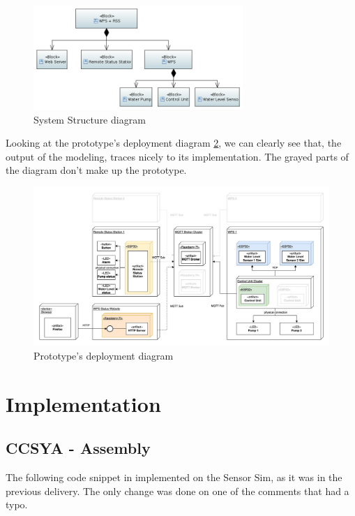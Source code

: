 \documentclass[11pt]{article}
\begin{document}
\begin{figure}[H]
  \centering
  \includegraphics[width=300px]{../diagrams/system-structure.png}
  \caption{System Structure diagram}
  \label{fig:System Structure Diagram}
\end{figure}

Looking at the prototype's deployment diagram \ref{fig:deployment-diagram}, we can clearly see that, the output of the modeling, traces nicely to its implementation.
The grayed parts of the diagram don't make up the prototype. 

\begin{figure}[H]
  \centering
  \includegraphics[width=\linewidth]{../diagrams/deployment-diagram.jpg}
  \caption{Prototype's deployment diagram}
  \label{fig:deployment-diagram}
\end{figure}

\newpage
\section{Implementation}

\subsection{CCSYA - Assembly}

The following code snippet in implemented on the Sensor Sim, as it was in the previous delivery. The only change was done on one of the comments that had a typo.
\end{document}
